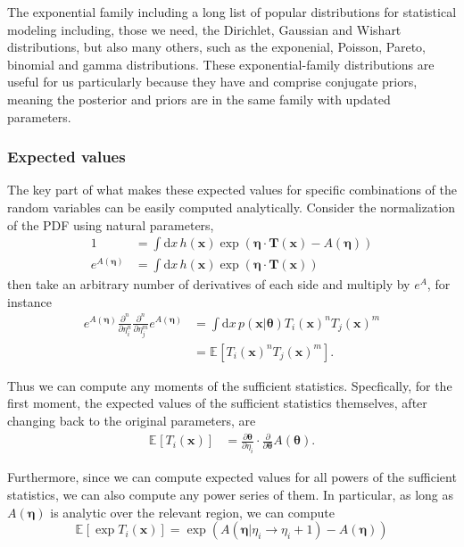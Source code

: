 \documentclass[aps,showpacs,twocolumn,prd,superscriptaddress,nofootinbib]{revtex4}
\newcommand{\be}{\begin{equation}}
\newcommand{\ee}{\end{equation}}
\newcommand{\E}[1]{{\mathbb E}_{#1}\!}
\begin{document}
The exponential family including a long list of popular distributions
for statistical modeling including, those we need, the Dirichlet,
Gaussian and Wishart distributions, but also many others, such as the
exponenial, Poisson, Pareto, binomial and gamma distributions.  These
exponential-family distributions are useful for us particularly
because they have and comprise conjugate priors, meaning the posterior
and priors are in the same family with updated parameters.

\subsubsection{Expected values}

The key part of what makes these expected values for specific
combinations of the random variables can be easily computed
analytically.  
Consider the normalization of the PDF using natural parameters,
%
\begin{align}
1&=\int{\mathrm dx\, h(\bm x)\exp{\left( \bm\eta \cdot \bm T(\bm x) - A(\bm\eta) \right) } }\\
    e^{A({\bm\eta})}&=\int{\mathrm dx\, h(\bm x)\exp{\left( \bm\eta \cdot \bm T(\bm x)\right)}}
\end{align}
%
then take an arbitrary number of derivatives of each side and multiply by $e^A$, for instance
\begin{align*}
  e^{ A({\bm\eta})}\frac{\partial^n}{\partial \eta_i^n}\frac{\partial^n}{\partial \eta_j^m}e^{A({\bm\eta})}
  &=\int{\mathrm dx\, p(\bm x|\bm \theta) T_i(\bm x)^nT_j(\bm x)^m }\nonumber\\
  &=\E{}\left[ T_i(\bm x)^nT_j(\bm x)^m\right].
\end{align*}

Thus we can compute any moments of the sufficient statistics. Specfically, for the first moment, the expected values of the sufficient statistics themselves, after changing back to the original parameters, are
\begin{align}
\E{} \left[ T_i(\bm x) \right]
&=
\frac{\partial\bm\theta}{\partial\eta_i}
\cdot\frac{\partial}{\partial \bm\theta} A(\bm\theta).
\end{align}
%

Furthermore, since we can compute expected values for all powers of the sufficient statistics, we can also compute any power series of them.  In particular, as long as $A(\bm\eta)$ is analytic over the relevant region, we can compute
\be
\E{}\left[\exp T_i(\bm x)\right]=\exp\left(A(\bm\eta|\eta_i\rightarrow\eta_i+1)-A(\bm\eta)\right)
\label{eq:EeT}
\ee
\end{document}
